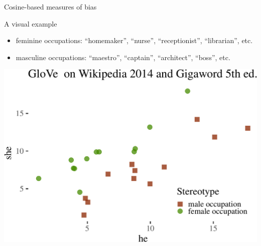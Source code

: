 \documentclass[10pt,ignorenonframetext,x11names, dvipsnames, bibspacing,natbib]{beamer}
\begin{document}
\begin{frame}{Cosine-based measures of bias}
\protect\hypertarget{cosine-based-measures-of-bias-3}{}

\begin{block}{A visual example}

\footnotesize

\begin{itemize}
\item
  feminine occupations: ``homemaker'', ``nurse'', ``receptionist'',
  ``librarian'', etc.
\item
  masculine occupations: ``maestro'', ``captain'', ``architect'',
  ``boss'', etc.
\end{itemize}

\normalsize

\vspace{1mm}
\footnotesize

\begin{center}\includegraphics[width=0.6\linewidth]{presentationESSLLI_files/figure-beamer/unnamed-chunk-1-1} \end{center}
\normalsize

\end{block}

\end{frame}
\end{document}
